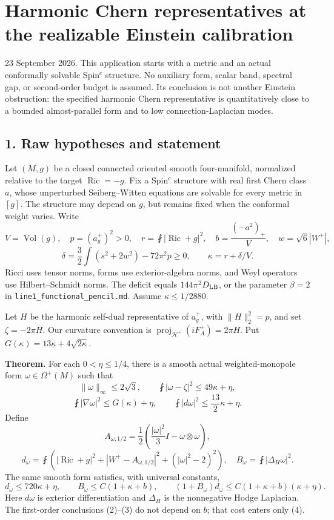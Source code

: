 \documentclass[
  11pt,
]{article}
\author{}
\date{23 September 2026}
\begin{document}
\hypertarget{harmonic-chern-representatives-at-the-realizable-einstein-calibration}{%
\section{Harmonic Chern representatives at the realizable Einstein
calibration}\label{harmonic-chern-representatives-at-the-realizable-einstein-calibration}}

23 September 2026. This application starts with a metric and an actual
conformally solvable Spin\(^c\) structure. No auxiliary form, scalar
band, spectral gap, or second-order budget is assumed. Its conclusion is
not another Einstein obstruction: the specified harmonic Chern
representative is quantitatively close to a bounded almost-parallel form
and to low connection-Laplacian modes.

\hypertarget{raw-hypotheses-and-statement}{%
\subsection{1. Raw hypotheses and
statement}\label{raw-hypotheses-and-statement}}

Let \((M,g)\) be a closed connected oriented smooth four-manifold,
normalized relative to the target \(\operatorname{Ric}=-g\). Fix a
Spin\(^c\) structure with real first Chern class \(a\), whose
unperturbed Seiberg--Witten equations are solvable for every metric in
\([g]\). The structure may depend on \(g\), but remains fixed when the
conformal weight varies. Write \[
 V=\operatorname{Vol}(g),\quad p=(a_g^+)^2>0,\quad
 r=\fint|\operatorname{Ric}+g|^2,\quad b=\frac{(-a^2)_+}{V},
 \quad w=\sqrt6|W^+|,
\] \[
 \delta=\frac32\int(s^2+2w^2)-72\pi^2p\ge0,
 \qquad \kappa=r+\delta/V.
 \tag{1}
\] Ricci uses tensor norms, forms use exterior-algebra norms, and Weyl
operators use Hilbert--Schmidt norms. The deficit equals
\(144\pi^2D_{\rm LB}\), or the parameter \(\beta=2\) in
\texttt{line1\_functional\_pencil.md}. Assume \(\kappa\le1/2880\).

Let \(H\) be the harmonic self-dual representative of \(a_g^+\), with
\(\|H\|_2^2=p\), and set \(\zeta=-2\pi H\). Our curvature convention is
\(\operatorname{proj}_{\mathcal H^+}(iF_A^+)=2\pi H\). Put
\(G(\kappa)=13\kappa+4\sqrt{2\kappa}\).

\textbf{Theorem.} For each \(0<\eta\le1/4\), there is a smooth actual
weighted-monopole form \(\omega\in\Omega^+(M)\) such that \[
 \|\omega\|_\infty\le2\sqrt3,
 \qquad \boxed{\fint|\omega-\zeta|^2\le49\kappa+\eta,}
 \tag{2}
\] \[
 \boxed{\fint|\nabla\omega|^2\le G(\kappa)+\eta,\qquad
 \fint|d\omega|^2\le\frac{13}{2}\kappa+\eta.}
 \tag{3}
\] Define \[
 A_{\omega,1/2}=\frac12
       \left(\frac{|\omega|^2}{3}I-\omega\otimes\omega\right),
\] \[
 d_\omega=\fint\left(|\operatorname{Ric}+g|^2
       +|W^+-A_{\omega,1/2}|^2+(|\omega|^2-2)^2\right),
 \quad B_\omega=\fint|\Delta_H\omega|^2.
\] The same smooth form satisfies, with universal constants, \[
 d_\omega\le720\kappa+\eta,\qquad
 B_\omega\le C(1+\kappa+b),\qquad
 (1+B_\omega)d_\omega\le C(1+\kappa+b)(\kappa+\eta).
 \tag{4}
\] Here \(d\omega\) is exterior differentiation and \(\Delta_H\) is the
nonnegative Hodge Laplacian. The first-order conclusions (2)--(3) do not
depend on \(b\); that cost enters only (4).
\end{document}

